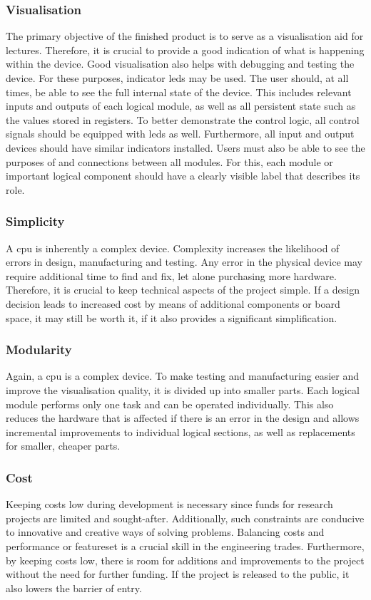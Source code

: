 \subsubsection{Visualisation}

The primary objective of the finished product is to serve as a visualisation aid for lectures. Therefore, it is crucial to provide a good indication of what is happening within the device. Good visualisation also helps with debugging and testing the device. For these purposes, indicator \acp{led} may be used. The user should, at all times, be able to see the full internal state of the device. This includes relevant inputs and outputs of each logical module, as well as all persistent state such as the values stored in registers. To better demonstrate the control logic, all control signals should be equipped with \acp{led} as well. Furthermore, all input and output devices should have similar indicators installed. Users must also be able to see the purposes of and connections between all modules. For this, each module or important logical component should have a clearly visible label that describes its role.

\subsubsection{Simplicity}

A \ac{cpu} is inherently a complex device. Complexity increases the likelihood of errors in design, manufacturing and testing. Any error in the physical device may require additional time to find and fix, let alone purchasing more hardware. Therefore, it is crucial to keep technical aspects of the project simple. If a design decision leads to increased cost by means of additional components or board space, it may still be worth it, if it also provides a significant simplification.

\subsubsection{Modularity}

Again, a \ac{cpu} is a complex device. To make testing and manufacturing easier and improve the visualisation quality, it is divided up into smaller parts. Each logical module performs only one task and can be operated individually. This also reduces the hardware that is affected if there is an error in the design and allows incremental improvements to individual logical sections, as well as replacements for smaller, cheaper parts.

\subsubsection{Cost}

Keeping costs low during development is necessary since funds for research projects are limited and sought-after. Additionally, such constraints are conducive to innovative and creative ways of solving problems. Balancing costs and performance or featureset is a crucial skill in the engineering trades. Furthermore, by keeping costs low, there is room for additions and improvements to the project without the need for further funding. If the project is released to the public, it also lowers the barrier of entry.
